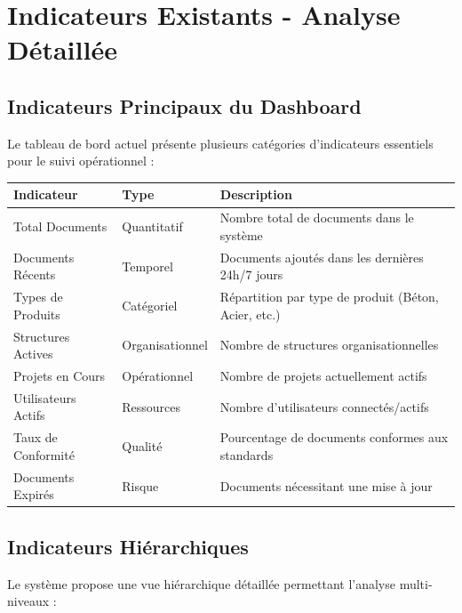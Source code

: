 \documentclass[12pt,a4paper]{article}
\begin{document}
\section{Indicateurs Existants - Analyse Détaillée}

\subsection{Indicateurs Principaux du Dashboard}

Le tableau de bord actuel présente plusieurs catégories d'indicateurs essentiels pour le suivi opérationnel :

\begin{longtable}{|p{4cm}|p{3cm}|p{7cm}|}
\hline
\rowcolor{lightgray}
\textbf{Indicateur} & \textbf{Type} & \textbf{Description} \\
\hline
\endhead

Total Documents & Quantitatif & Nombre total de documents dans le système \\
\hline
Documents Récents & Temporel & Documents ajoutés dans les dernières 24h/7 jours \\
\hline
Types de Produits & Catégoriel & Répartition par type de produit (Béton, Acier, etc.) \\
\hline
Structures Actives & Organisationnel & Nombre de structures organisationnelles \\
\hline
Projets en Cours & Opérationnel & Nombre de projets actuellement actifs \\
\hline
Utilisateurs Actifs & Ressources & Nombre d'utilisateurs connectés/actifs \\
\hline
Taux de Conformité & Qualité & Pourcentage de documents conformes aux standards \\
\hline
Documents Expirés & Risque & Documents nécessitant une mise à jour \\
\hline
\end{longtable}

\subsection{Indicateurs Hiérarchiques}

Le système propose une vue hiérarchique détaillée permettant l'analyse multi-niveaux :
\end{document}

